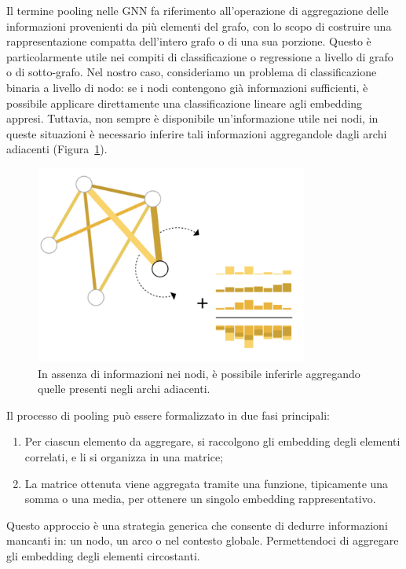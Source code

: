 Il termine pooling nelle GNN fa riferimento all’operazione di aggregazione delle informazioni provenienti da più elementi del grafo, con lo scopo di costruire una rappresentazione compatta dell’intero grafo o di una sua porzione. Questo è particolarmente utile nei compiti di classificazione o regressione a livello di grafo o di sotto-grafo. Nel nostro caso, consideriamo un problema di classificazione binaria a livello di nodo: se i nodi contengono già informazioni sufficienti, è possibile applicare direttamente una classificazione lineare agli embedding appresi. Tuttavia, non sempre è disponibile un'informazione utile nei nodi, in queste situazioni è necessario inferire tali informazioni aggregandole dagli archi adiacenti (Figura~\ref{fig:aggEdg}).
\begin{figure}
    \centering
    \includegraphics[width=0.8\textwidth]{figure/AggEdges.png}
    \caption{In assenza di informazioni nei nodi, è possibile inferirle aggregando quelle presenti negli archi adiacenti.}
    \label{fig:aggEdg}
\end{figure}
Il processo di pooling può essere formalizzato in due fasi principali:

\begin{enumerate}
    \item Per ciascun elemento da aggregare, si raccolgono gli embedding degli elementi correlati, e li si organizza in una matrice;
    \item La matrice ottenuta viene aggregata tramite una funzione, tipicamente una somma o una media, per ottenere un singolo embedding rappresentativo.
\end{enumerate}

Questo approccio è una strategia generica che consente di dedurre informazioni mancanti in: un nodo, un arco o nel contesto globale. Permettendoci di aggregare gli embedding degli elementi circostanti.

